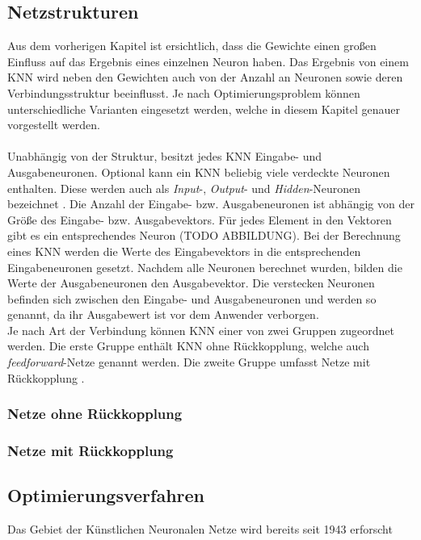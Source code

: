 \subsection{Netzstrukturen}
\label{subsec:network_structures}
Aus dem vorherigen Kapitel ist ersichtlich, dass die Gewichte einen großen Einfluss auf das Ergebnis eines einzelnen Neuron haben. Das Ergebnis von einem \ac{KNN} wird neben den Gewichten auch von der Anzahl an Neuronen sowie deren Verbindungsstruktur beeinflusst. Je nach Optimierungsproblem können unterschiedliche Varianten eingesetzt werden, welche in diesem Kapitel genauer vorgestellt werden. 
\\\\ %
Unabhängig von der Struktur, besitzt jedes \ac{KNN} Eingabe- und Ausgabeneuronen. Optional kann ein \ac{KNN} beliebig viele verdeckte Neuronen enthalten. Diese werden auch als \emph{Input}-, \emph{Output}- und \emph{Hidden}-Neuronen bezeichnet \cite{zell2003simulation}. Die Anzahl der Eingabe- bzw. Ausgabeneuronen ist abhängig von der Größe des Eingabe- bzw. Ausgabevektors. Für jedes Element in den Vektoren gibt es ein entsprechendes Neuron (TODO ABBILDUNG). Bei der Berechnung eines \ac{KNN} werden die Werte des Eingabevektors in die entsprechenden Eingabeneuronen gesetzt. Nachdem alle Neuronen berechnet wurden, bilden die Werte der Ausgabeneuronen den Ausgabevektor. Die verstecken Neuronen befinden sich zwischen den Eingabe- und Ausgabeneuronen und werden so genannt, da ihr Ausgabewert ist vor dem Anwender verborgen. \\
Je nach Art der Verbindung können \ac{KNN} einer von zwei Gruppen zugeordnet werden. Die erste Gruppe enthält \ac{KNN} ohne Rückkopplung, welche auch \emph{feedforward}-Netze genannt werden. Die zweite Gruppe umfasst Netze mit Rückkopplung \cite{zell2003simulation}.
\subsubsection{Netze ohne Rückkopplung}
\subsubsection{Netze mit Rückkopplung}

\subsection{Optimierungsverfahren}
\label{subsec:optimization_strategies}

Das Gebiet der Künstlichen Neuronalen Netze wird bereits seit 1943 erforscht